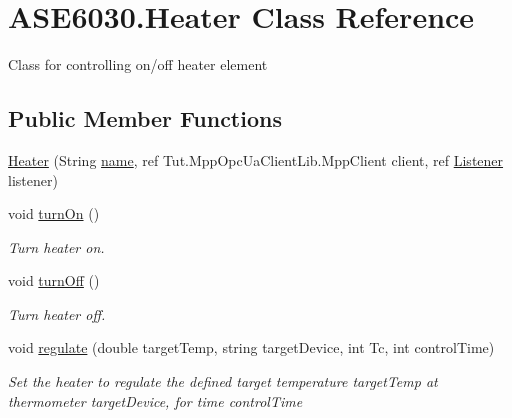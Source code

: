 \hypertarget{class_a_s_e6030_1_1_heater}{}\section{A\+S\+E6030.\+Heater Class Reference}
\label{class_a_s_e6030_1_1_heater}


Class for controlling on/off heater element  


\subsection*{Public Member Functions}
\begin{DoxyCompactItemize}
\item 
\hyperlink{class_a_s_e6030_1_1_heater_a1c0420d0f56eb7e1a7d43c44520ae07b}{Heater} (String \hyperlink{class_a_s_e6030_1_1_heater_a0f7ba6c365f98047a0e8e7f3017fafab}{name}, ref Tut.\+Mpp\+Opc\+Ua\+Client\+Lib.\+Mpp\+Client client, ref \hyperlink{class_a_s_e6030_1_1_listener}{Listener} listener)
\item 
void \hyperlink{class_a_s_e6030_1_1_heater_a0ef024666587dbe494c647214658b412}{turn\+On} ()
\begin{DoxyCompactList}\small\item\em Turn heater on. \end{DoxyCompactList}\item 
void \hyperlink{class_a_s_e6030_1_1_heater_a38a0281112b0ab7d5922e52d0a2cecec}{turn\+Off} ()
\begin{DoxyCompactList}\small\item\em Turn heater off. \end{DoxyCompactList}\item 
void \hyperlink{class_a_s_e6030_1_1_heater_a6b695a9e9acf4ae4947bf3a968c8e6e3}{regulate} (double target\+Temp, string target\+Device, int Tc, int control\+Time)
\begin{DoxyCompactList}\small\item\em Set the heater to regulate the defined target temperature target\+Temp at thermometer target\+Device, for time control\+Time \end{DoxyCompactList}\end{DoxyCompactItemize}
